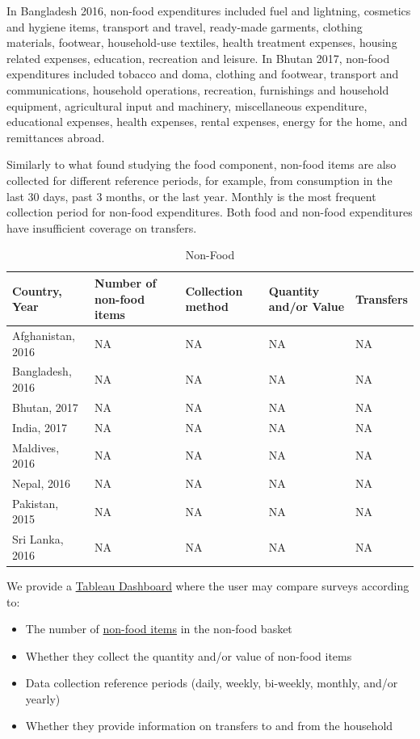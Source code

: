 \documentclass[13 pt,]{book}
\providecommand{\tightlist}{%
  \setlength{\itemsep}{0pt}\setlength{\parskip}{0pt}}
\begin{document}
In Bangladesh 2016, non-food expenditures included fuel and lightning,
cosmetics and hygiene items, transport and travel, ready-made garments,
clothing materials, footwear, household-use textiles, health treatment
expenses, housing related expenses, education, recreation and leisure.
In Bhutan 2017, non-food expenditures included tobacco and doma,
clothing and footwear, transport and communications, household
operations, recreation, furnishings and household equipment,
agricultural input and machinery, miscellaneous expenditure, educational
expenses, health expenses, rental expenses, energy for the home, and
remittances abroad.

Similarly to what found studying the food component, non-food items are
also collected for different reference periods, for example, from
consumption in the last 30 days, past 3 months, or the last year.
Monthly is the most frequent collection period for non-food
expenditures. Both food and non-food expenditures have insufficient
coverage on transfers.

\begin{table}[t]

\caption{\label{tab:nonfood}Non-Food}
\centering
\begin{tabular}{lllll}
\toprule
Country, Year & Number of non-food items & Collection method & Quantity and/or Value & Transfers\\
\midrule
Afghanistan, 2016 & NA & NA & NA & NA\\
Bangladesh, 2016 & NA & NA & NA & NA\\
Bhutan, 2017 & NA & NA & NA & NA\\
India, 2017 & NA & NA & NA & NA\\
Maldives, 2016 & NA & NA & NA & NA\\
\addlinespace
Nepal, 2016 & NA & NA & NA & NA\\
Pakistan, 2015 & NA & NA & NA & NA\\
Sri Lanka, 2016 & NA & NA & NA & NA\\
\bottomrule
\end{tabular}
\end{table}

We provide a
\href{https://tab.worldbank.org/\#/site/WBG/views/SAR_MNA_Metadata/NonFood}{Tableau
Dashboard} where the user may compare surveys according to:

\begin{itemize}
\tightlist
\item
  The number of
  \href{https://tab.worldbank.org/\#/site/WBG/views/SAR_MNA_Metadata/Items}{non-food
  items} in the non-food basket
\item
  Whether they collect the quantity and/or value of non-food items
\item
  Data collection reference periods (daily, weekly, bi-weekly, monthly,
  and/or yearly)
\item
  Whether they provide information on transfers to and from the
  household
\end{itemize}
\end{document}
